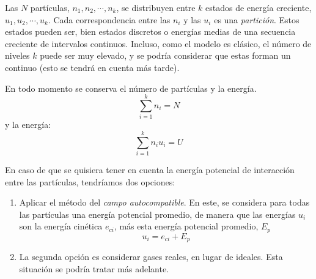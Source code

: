 Las $N$ partículas, $n_1, n_2, \cdots, n_k$, se distribuyen entre $k$ estados
de energía creciente,  $u_1, u_2, \cdots, u_k$. Cada correspondencia entre
las $n_i$ y las $u_i$ es una \emph{partición}. Estos estados pueden ser, bien
estados discretos o energías medias de una secuencia creciente de intervalos
continuos. Incluso, como el modelo es clásico, el número de niveles $k$ puede
ser muy elevado, y se podría considerar que estas forman un continuo (esto se
tendrá en cuenta más tarde).

En todo momento se conserva el número de partículas y la energía.
\begin{equation}
  \sum_{i=1}^{k} n_i = N
\end{equation}
y la energía:
\begin{equation}
  \sum_{i=1}^{k} n_i u_i = U
\end{equation}

En caso de que se quisiera tener en cuenta la energía potencial de interacción
entre las partículas, tendríamos dos opciones:
\begin{enumerate}
\item Aplicar el método del \emph{campo autocompatible}. En este, se considera
  para todas las partículas una energía potencial promedio, de manera que las
  energías $u_i$ son la energía cinética $e_{ci}$, más esta energía
  potencial promedio, $E_p$
  \[
    u_i = e_{ci} + E_p
  \]
\item La segunda opción es considerar gases reales, en lugar de ideales. Esta
  situación se podría tratar más adelante.
\end{enumerate}




